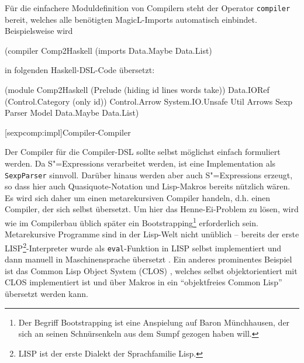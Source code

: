 \documentclass[12pt, a4paper, bibgerm]{scrbook}
\newenvironment{DIFnomarkup}{}{}
\newcommand\icode[1]{\lstinline?#1?}
\newcommand\lsection{}
\newcommand{\sexps}{S"=Expressions}
\begin{document}
Für die einfachere Moduldefinition von Compilern steht der Operator
\icode{compiler} bereit, welches alle benötigten MagicL-Imports
automatisch einbindet. Beispielsweise wird
\begin{DIFnomarkup}\begin{code}
(compiler Comp2Haskell (imports Data.Maybe Data.List)  
\end{code}\end{DIFnomarkup}
in folgenden Haskell-DSL-Code übersetzt:
\begin{DIFnomarkup}\begin{code}
(module
  Comp2Haskell
  (Prelude (hiding id lines words take))
  Data.IORef
  (Control.Category (only id))
  Control.Arrow
  System.IO.Unsafe
  Util
  Arrows
  Sexp
  Parser
  Model
  Data.Maybe
  Data.List)
\end{code}\end{DIFnomarkup}

\lsection[sexpcomp:impl]{Compiler-Compiler}

Der Compiler für die Compiler-DSL sollte selbst möglichst einfach
formuliert werden. Da \sexps{} verarbeitet werden, ist eine
Implementation als \icode{SexpParser} sinnvoll. Darüber hinaus werden aber
auch \sexps{} erzeugt, so dass hier auch Quasiquote-Notation und
Lisp-Makros bereits nützlich wären. Es wird sich daher um einen
metarekursiven Compiler handeln, d.h. einen Compiler, der sich selbst
übersetzt. Um hier das Henne-Ei-Problem zu lösen, wird wie im
Compilerbau üblich später ein Bootstrapping\footnote{Der Begriff
  Bootstrapping ist eine Anspielung auf Baron Münchhausen, der sich an
  seinen Schnürsenkeln aus dem Sumpf gezogen haben will.} erforderlich
sein. Metarekursive Programme sind in der Lisp-Welt nicht unüblich --
bereits der erste LISP\footnote{LISP ist der erste Dialekt der
  Sprachfamilie Lisp.}-Interpreter wurde als \icode{eval}-Funktion in
LISP selbst implementiert und dann manuell in Maschinensprache übersetzt
\cite{LispHistory}. Ein anderes prominentes Beispiel ist das Common Lisp
Object System (CLOS) \cite{MetaobjectProtocol}, welches selbst
objektorientiert mit CLOS implementiert ist und über Makros in ein
"`objektfreies Common Lisp"' übersetzt werden kann.
\end{document}
